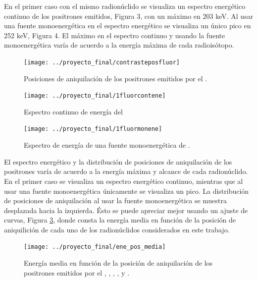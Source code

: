 \documentclass[12pt,a4paper,onecolumn]{article}
\begin{document}
En el primer caso con el mismo radionúclido se visualiza un espectro energético continuo de los positrones emitidos, Figura 3, con un máximo en 203 keV. Al usar una fuente monoenergética en el espectro energético se visualiza un único pico en 252 keV, Figura 4. El máximo en el espectro continuo y usando la fuente monoenergética varía de acuerdo a la energía máxima de cada radioisótopo.
\begin{figure}[h]
	\centering
	\texttt{[image: ../proyecto\_final/contrasteposfluor]}
	\caption{Posiciones de aniquilación de los positrones emitidos por el .}
	\label{fig:contrasteposfluor}
\end{figure}

\begin{figure}[H]
\centering
  \begin{minipage}{0.45\textwidth}
	\centering
    \texttt{[image: ../proyecto\_final/1fluorcontene]}
    \caption{Espectro continuo de energía del }
  \end{minipage}
  \hspace{5mm}
  \begin{minipage}{0.45\textwidth}
	\centering
	\texttt{[image: ../proyecto\_final/1fluormonene]}
	\caption{Espectro de energía de una fuente monoenergética de .}
	\label{fig:1fluormonene}
  \end{minipage}	
\end{figure}
El espectro energético y la distribución de posiciones de aniquilación de los positrones varía de acuerdo a la energía máxima y alcance de cada radionúclido. En el primer caso se visualiza un espectro energético continuo, mientras que al usar una fuente monoenergética únicamente se visualiza un pico. La distribución de posiciones de aniquilación al usar la fuente monoenergética se muestra desplazada hacia la izquierda. Ésto se puede apreciar mejor usando un ajuste de curvas, Figura \ref{fig:eneposmedia}, donde consta la energía media en función de la posición de aniquilición de cada uno de los radionúclidos considerados en este trabajo. 
\begin{figure}[H]
	\centering
	\texttt{[image: ../proyecto\_final/ene\_pos\_media]}
	\caption{Energía media en función de la posición de aniquilación de los positrones emitidos por el , , , ,  y .}
	\label{fig:eneposmedia}
\end{figure}
\end{document}
